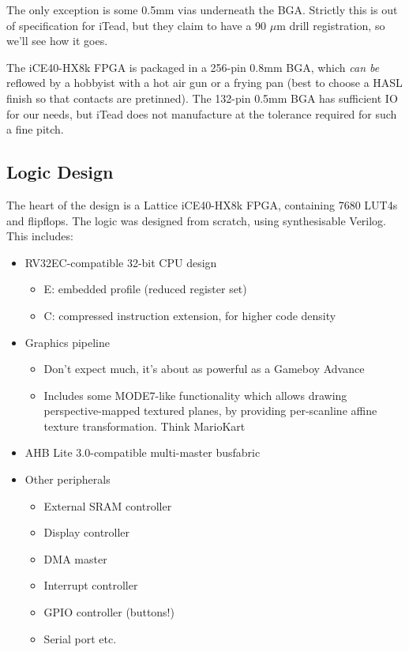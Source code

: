 \documentclass{article}
\begin{document}
The only exception is some 0.5mm vias underneath the BGA. Strictly this is out of specification for iTead, but they claim to have a 90 $\mu$m drill registration, so we'll see how it goes.

The iCE40-HX8k FPGA is packaged in a 256-pin 0.8mm BGA, which \textit{can be} reflowed by a hobbyist with a hot air gun or a frying pan (best to choose a HASL finish so that contacts are pretinned). The 132-pin 0.5mm BGA has sufficient IO for our needs, but iTead does not manufacture at the tolerance required for such a fine pitch.

\subsection{Logic Design}

The heart of the design is a Lattice iCE40-HX8k FPGA, containing 7680 LUT4s and flipflops. The logic was designed from scratch, using synthesisable Verilog. This includes:
\begin{itemize}
\item RV32EC-compatible 32-bit CPU design
	\begin{itemize}
	\item E: embedded profile (reduced register set)
	\item C: compressed instruction extension, for higher code density
	\end{itemize}
\item Graphics pipeline
	\begin{itemize}
	\item Don't expect much, it's about as powerful as a Gameboy Advance
	\item Includes some MODE7-like functionality which allows drawing perspective-mapped textured planes, by providing per-scanline affine texture transformation. Think MarioKart
	\end{itemize}
\item AHB Lite 3.0-compatible multi-master busfabric
\item Other peripherals
	\begin{itemize}
	\item External SRAM controller
	\item Display controller
	\item DMA master
	\item Interrupt controller
	\item GPIO controller (buttons!)
	\item Serial port etc.
	\end{itemize}
\end{itemize}
\end{document}
